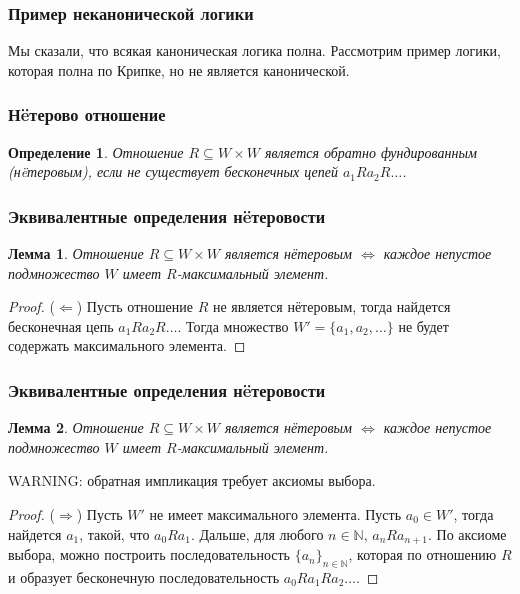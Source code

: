 \documentclass[pdf,utf8,russian,aspectratio=169]{beamer}
\newtheorem{defin}{Определение}
\newtheorem{lem}{Лемма}
\begin{document}
\begin{frame}
  \frametitle{Пример неканонической логики}

  Мы сказали, что всякая каноническая логика полна. Рассмотрим пример логики, которая полна по Крипке, но не является канонической.
\end{frame}

\begin{frame}
  \frametitle{Н\"{e}терово отношение}
\begin{defin}
  Отношение $R \subseteq W \times W$ является обратно фундированным (н\"{e}теровым), если не существует бесконечных цепей $a_1 R a_2 R \dots$.
\end{defin}
\end{frame}

\begin{frame}
  \frametitle{Эквивалентные определения н\"{e}теровости}
\begin{lem}
  Отношение $R \subseteq W \times W$ является н\"{е}теровым $\Leftrightarrow$ каждое непустое подмножество $W$ имеет $R$-максимальный элемент.
\end{lem}

\begin{proof}
  ($\Leftarrow$) Пусть отношение $R$ не является н\"{е}теровым, тогда найдется бесконечная цепь $a_1 R a_2 R \dots$. Тогда множество $W' = \{ a_1, a_2, \dots \}$ не будет содержать максимального элемента.
\end{proof}
\end{frame}

\begin{frame}
  \frametitle{Эквивалентные определения н\"{e}теровости}
\begin{lem}
  Отношение $R \subseteq W \times W$ является н\"{е}теровым $\Leftrightarrow$ каждое непустое подмножество $W$ имеет $R$-максимальный элемент.
\end{lem}

WARNING: обратная импликация требует аксиомы выбора.

\begin{proof}
  ($\Rightarrow$) Пусть $W'$ не имеет максимального элемента. Пусть $a_0 \in W'$, тогда найдется $a_1$, такой, что $a_0 R a_1$. Дальше, для любого $n \in \mathbb{N}$, $a_n R a_{n + 1}$. По аксиоме выбора, можно построить последовательность $\{ a_n \}_{n \in \mathbb{N}}$, которая по отношению $R$ и образует
  бесконечную последовательность $a_0 R a_1 R a_2 \dots$.
\end{proof}
\end{frame}
\end{document}
